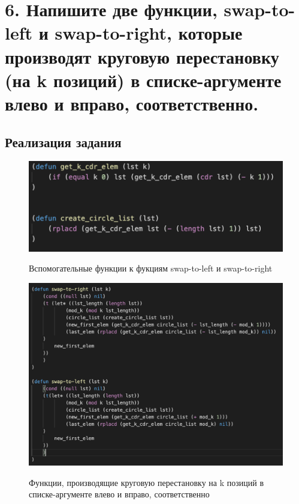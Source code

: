 \documentclass[a4paper,12pt]{article}
\begin{document}
	\newpage
	
	\section*{6. Напишите две функции, swap-to-left и swap-to-right, которые производят круговую перестановку (на k позиций) в списке-аргументе влево и вправо, соответственно.}
	
	\subsection*{Реализация задания}
	
	\begin{figure}[h!]
		\begin{center}
			{\includegraphics[scale = 0.9]{6.2.png}}
			\label{ris:6.2}
		\end{center}
	\caption{Вспомогательные функции к фукциям swap-to-left и swap-to-right}
	\end{figure}

	\begin{figure}[h!]
		\begin{center}
			{\includegraphics[scale = 0.8]{6.1.png}}
			\label{ris:6.1}
		\end{center}
	\caption{Функции, производящие круговую перестановку на k позиций в списке-аргументе влево и вправо, соответственно}
	\end{figure}
\end{document}
